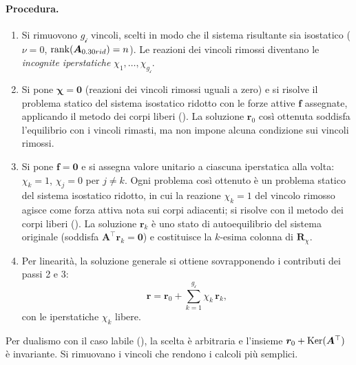 \paragraph{Procedura.}
\begin{enumerate}[label=(\arabic*), leftmargin=*,
	itemsep=4pt]
	
	\item{} Si rimuovono $g_{\mathscr{i}}$ vincoli, scelti in modo che il
	sistema risultante sia isostatico ($\nu = 0$,
	$\operatorname{rank}(\bm{A}_{0.30 rid}) = n$). Le reazioni dei vincoli rimossi
	diventano le \emph{incognite iperstatiche} $\chi_1, \ldots,
	\chi_{g_{\mathscr{i}}}$.
	
	\item Si pone $\bm{\chi} = \bm{0}$ (reazioni dei vincoli rimossi uguali
	a zero) e si risolve il problema statico del sistema isostatico
	ridotto con le forze attive $\bm{f}$ assegnate, applicando il
	metodo dei corpi liberi (). La soluzione
	$\bm{r}_0$ così ottenuta soddisfa l'equilibrio con i vincoli
	rimasti, ma non impone alcuna condizione sui vincoli rimossi.
	
	\item Si pone $\bm{f} = \bm{0}$ e si assegna valore unitario a
	ciascuna iperstatica alla volta: $\chi_k = 1$, $\chi_j = 0$ per
	$j \neq k$. Ogni problema così ottenuto è un problema statico
	del sistema isostatico ridotto, in cui la reazione $\chi_k = 1$
	del vincolo rimosso agisce come forza attiva nota sui corpi
	adiacenti; si risolve con il metodo dei corpi liberi
	(). La soluzione
	$\bm{r}_k$ è uno stato di autoequilibrio del sistema originale
	(soddisfa $\bm{A}^{\top}\bm{r}_k = \bm{0}$) e costituisce la
	$k$-esima colonna di $\bm{R}_\chi$.
	
	\item Per linearità, la soluzione generale si ottiene sovrapponendo
	i contributi dei passi 2 e 3:
	\begin{equation}
		\bm{r} = \bm{r}_0 +
		\sum_{k=1}^{g_{\mathscr{i}}} \chi_k\,\bm{r}_k,
	\end{equation}
	con le iperstatiche $\chi_k$ libere. 
	
\end{enumerate}


\begin{oss}
	Per dualismo con il caso labile (),
	la scelta è arbitraria e l'insieme
	$\bm{r}_0 + \operatorname{Ker}(\bm{A}^{\top})$ è invariante. Si
	rimuovano i vincoli che rendono i calcoli più semplici.
\end{oss}

